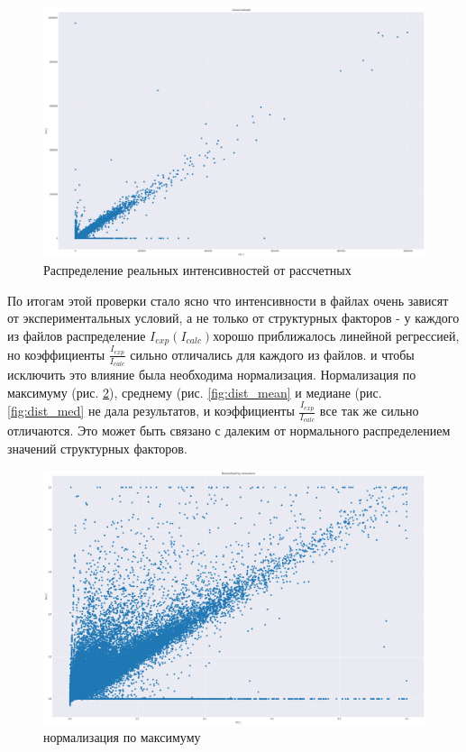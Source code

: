\documentclass{article}
\begin{document}
\begin{figure}[!htp]
  \includegraphics[width=\linewidth]{imgs/dist.png}
  \caption{Распределение реальных интенсивностей от рассчетных}
  \label{img:dist}
\end{figure}


 По итогам этой проверки стало ясно что интенсивности в файлах очень зависят от экспериментальных условий, а не только от структурных факторов - у каждого из файлов распределение $I_{exp}(I_{calc})$хорошо приближалось линейной регрессией, но коэффициенты $\frac{I_{exp}}{I_{calc}}$ сильно отличались для каждого из файлов. и чтобы исключить это влияние была необходима нормализация. Нормализация по максимуму (рис. \ref{fig:dist_max}), среднему (рис. \ref{fig:dist_mean} и медиане (рис. \ref{fig:dist_med} не дала результатов, и коэффициенты $\frac{I_{exp}}{I_{calc}}$ все так же сильно отличаются. Это может быть связано с далеким от нормального распределением значений структурных факторов.

\begin{figure}[!htp]
\includegraphics[width=\linewidth]{imgs/dist_max.png}
  \caption{нормализация по максимуму}\label{fig:dist_max}
\end{figure}
\end{document}
